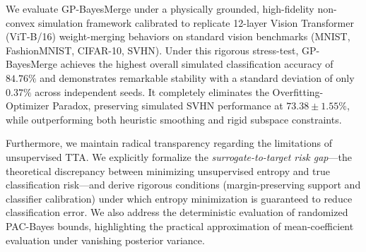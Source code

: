 We evaluate GP-BayesMerge under a physically grounded, high-fidelity non-convex
simulation framework calibrated to replicate 12-layer Vision Transformer
(ViT-B/16) weight-merging behaviors on standard vision benchmarks (MNIST,
FashionMNIST, CIFAR-10, SVHN). Under this rigorous stress-test, GP-BayesMerge
achieves the highest overall simulated classification accuracy of $84.76\%$ and
demonstrates remarkable stability with a standard deviation of only $0.37\%$
across independent seeds. It completely eliminates the Overfitting-Optimizer
Paradox, preserving simulated SVHN performance at $73.38 \pm 1.55\%$, while
outperforming both heuristic smoothing and rigid subspace constraints.

Furthermore, we maintain radical transparency regarding the limitations of
unsupervised TTA. We explicitly formalize the \emph{surrogate-to-target risk
gap}---the theoretical discrepancy between minimizing unsupervised entropy and
true classification risk---and derive rigorous conditions (margin-preserving
support and classifier calibration) under which entropy minimization is
guaranteed to reduce classification error. We also address the deterministic
evaluation of randomized PAC-Bayes bounds, highlighting the practical
approximation of mean-coefficient evaluation under vanishing posterior variance.
